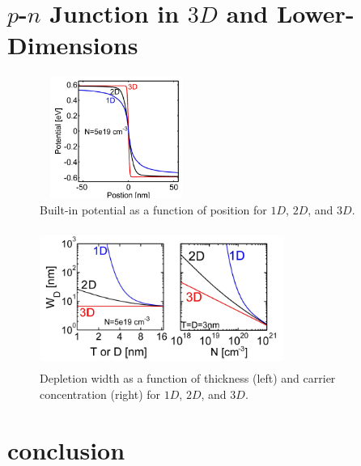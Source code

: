 \section{$p$-$n$ Junction in $3D$ and Lower-Dimensions}\label{sec:sec004}

\begin{figure}[h!]\label{fig:fig09}
    \centering
    \includegraphics[height=4cm,width=5cm]{figs/2d_3d}
    \caption{Built-in potential as a function of position for $1D$, $2D$, and $3D$.}
\end{figure}

\begin{figure}[h!]\label{fig:fig08}
    \centering
    \includegraphics[height=4.5cm,width=8cm]{figs/2d_3d_wd_dep}
    \caption{Depletion width as a function of thickness (left) and carrier concentration (right) for $1D$, $2D$, and $3D$.}
\end{figure}

\section{conclusion}\label{sec:sec005}
